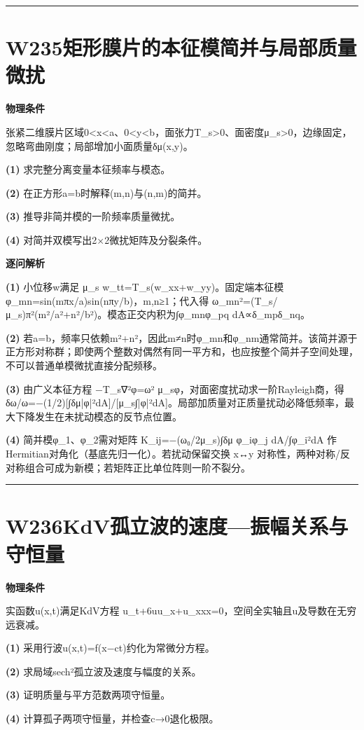 \documentclass[UTF8,a4paper,11pt,oneside,openany]{ctexbook}
\begin{document}
\par\bigskip\hrule\bigskip
\section*{W235\quad 矩形膜片的本征模简并与局部质量微扰}
\textbf{物理条件}\par 张紧二维膜片区域0<x<a、0<y<b，面张力T\_s>0、面密度μ\_s>0，边缘固定，忽略弯曲刚度；局部增加小面质量δμ(x,y)。
\par\noindent\textbf{(1)} 求完整分离变量本征频率与模态。
\par\noindent\textbf{(2)} 在正方形a=b时解释(m,n)与(n,m)的简并。
\par\noindent\textbf{(3)} 推导非简并模的一阶频率质量微扰。
\par\noindent\textbf{(4)} 对简并双模写出2×2微扰矩阵及分裂条件。

\par\medskip\noindent\textbf{逐问解析}
\par\noindent\textbf{(1)} 小位移w满足 μ\_s w\_tt=T\_s(w\_xx+w\_yy)。固定端本征模 φ\_mn=sin(mπx/a)sin(nπy/b)，m,n≥1；代入得 ω\_mn²=(T\_s/μ\_s)π²(m²/a²+n²/b²)。模态正交内积为∫φ\_mnφ\_pq dA∝δ\_mpδ\_nq。
\par\noindent\textbf{(2)} 若a=b，频率只依赖m²+n²，因此m≠n时φ\_mn和φ\_nm通常简并。该简并源于正方形对称群；即使两个整数对偶然有同一平方和，也应按整个简并子空间处理，不可以普通单模微扰直接分配频移。
\par\noindent\textbf{(3)} 由广义本征方程 −T\_s∇²φ=ω² μ\_sφ，对面密度扰动求一阶Rayleigh商，得 δω/ω=−(1/2)[∫δμ|φ|²dA]/[μ\_s∫|φ|²dA]。局部加质量对正质量扰动必降低频率，最大下降发生在未扰动模态的反节点位置。
\par\noindent\textbf{(4)} 简并模φ\_1、φ\_2需对矩阵 K\_ij=−(ω₀/2μ\_s)∫δμ φ\_iφ\_j dA/∫φ\_i²dA 作Hermitian对角化（基底先归一化）。若扰动保留交换 x↔y 对称性，两种对称/反对称组合可成为新模；若矩阵正比单位阵则一阶不裂分。

\par\bigskip\hrule\bigskip
\section*{W236\quad KdV孤立波的速度—振幅关系与守恒量}
\textbf{物理条件}\par 实函数u(x,t)满足KdV方程 u\_t+6uu\_x+u\_xxx=0，空间全实轴且u及导数在无穷远衰减。
\par\noindent\textbf{(1)} 采用行波u(x,t)=f(x−ct)约化为常微分方程。
\par\noindent\textbf{(2)} 求局域sech²孤立波及速度与幅度的关系。
\par\noindent\textbf{(3)} 证明质量与平方范数两项守恒量。
\par\noindent\textbf{(4)} 计算孤子两项守恒量，并检查c→0退化极限。
\end{document}
